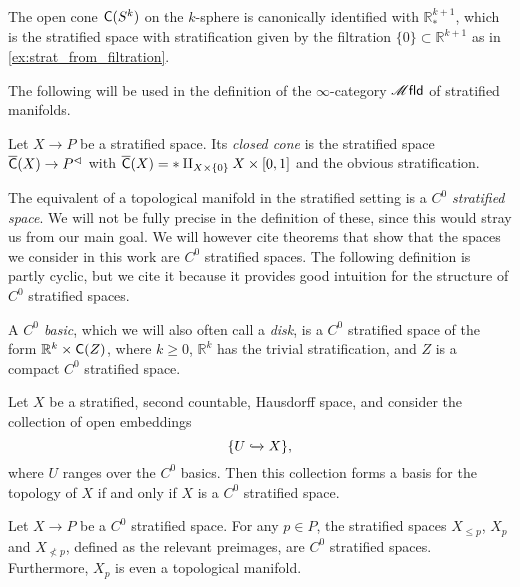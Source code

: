 \documentclass[../text]{subfiles}
\begin{document}
\begin{example}
    The open cone $\cone(S^k)$ on the $k$-sphere is canonically identified with $\mathbb{R}^{k+1}_*$, which is the stratified space with stratification given by the filtration $\{0\}\subset\mathbb{R}^{k+1}$ as in \cref{ex:strat_from_filtration}.
\end{example}

The following will be used in the definition of the $\infty$-category $\mfld$ of stratified manifolds.

\begin{definition}
    Let $X \to P$ be a stratified space. Its \emph{closed cone} is the stratified space $\cone[b](X) \to P^{\vartriangleleft}$ with $\cone[b](X) = \ast\amalg_{X \times \{0\}} X \times [0,1]$ and the obvious stratification.
\end{definition}

The equivalent of a topological manifold in the stratified setting is a \emph{$C^0$ stratified space}. We will not be fully precise in the definition of these, since this would stray us from our main goal. We will however cite theorems that show that the spaces we consider in this work are $C^0$ stratified spaces. The following definition is partly cyclic, but we cite it because it provides good intuition for the structure of $C^0$ stratified spaces.

\begin{definition}
    A \emph{$C^0$ basic}, which we will also often call a \emph{disk}, is a $C^0$ stratified space of the form $\mathbb{R}^k \times \cone(Z)$, where $k \geq 0$, $\mathbb{R}^k$ has the trivial stratification, and $Z$ is a compact $C^0$ stratified space.
\end{definition}

\begin{theorem}\label{thm:basics_give_basis}
    Let $X$ be a stratified, second countable, Hausdorff space, and consider the collection of open embeddings
    \begin{equation}
        \{ U \xhookrightarrow{} X\},
    \end{equation}
    where $U$ ranges over the $C^0$ basics. Then this collection forms a basis for the topology of $X$ if and only if $X$ is a $C^0$ stratified space.
\end{theorem}

\begin{theorem}
    Let $X \rightarrow P$ be a $C^0$ stratified space. For any $p \in P$, the stratified spaces $X_{\leq p}$, $X_{p}$ and $X_{\nless p}$, defined as the relevant preimages, are $C^0$ stratified spaces. Furthermore, $X_p$ is even a topological manifold.
\end{theorem}
\end{document}
